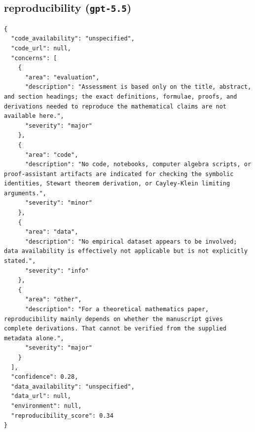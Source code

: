 \documentclass[11pt]{article}
\begin{document}
\subsection*{reproducibility (\texttt{gpt-5.5})}
\begin{verbatim}
{
  "code_availability": "unspecified",
  "code_url": null,
  "concerns": [
    {
      "area": "evaluation",
      "description": "Assessment is based only on the title, abstract, and section headings; the exact definitions, formulae, proofs, and derivations needed to reproduce the mathematical claims are not available here.",
      "severity": "major"
    },
    {
      "area": "code",
      "description": "No code, notebooks, computer algebra scripts, or proof-assistant artifacts are indicated for checking the symbolic identities, Stewart theorem derivation, or Cayley-Klein limiting arguments.",
      "severity": "minor"
    },
    {
      "area": "data",
      "description": "No empirical dataset appears to be involved; data availability is effectively not applicable but is not explicitly stated.",
      "severity": "info"
    },
    {
      "area": "other",
      "description": "For a theoretical mathematics paper, reproducibility mainly depends on whether the manuscript gives complete derivations. That cannot be verified from the supplied metadata alone.",
      "severity": "major"
    }
  ],
  "confidence": 0.28,
  "data_availability": "unspecified",
  "data_url": null,
  "environment": null,
  "reproducibility_score": 0.34
}
\end{verbatim}
\end{document}
